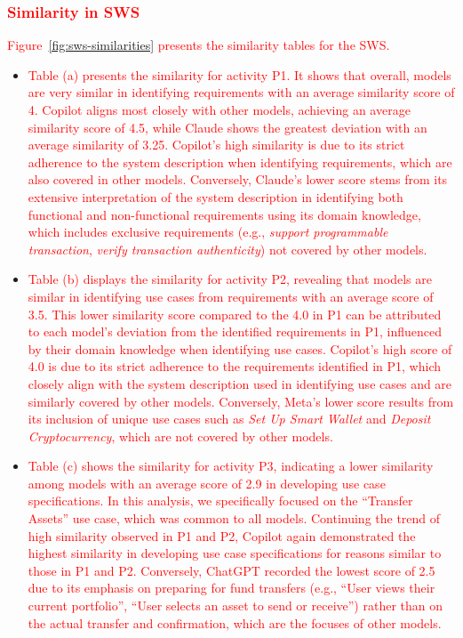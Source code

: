 \subsubsection{\textcolor{red}{Similarity in SWS}}
\label{sssec:sws-similarity}
\textcolor{red}{Figure~\ref{fig:sws-similarities} presents the similarity tables for the SWS.} 

\begin{itemize}
	\item \textcolor{red}{Table (a) presents the similarity for activity P1. It shows that overall, models are very similar in identifying requirements with an average similarity score of 4. Copilot aligns most closely with other models, achieving an average similarity score of 4.5, while Claude shows the greatest deviation with an average similarity of 3.25. Copilot's high similarity is due to its strict adherence to the system description when identifying requirements, which are also covered in other models. Conversely, Claude's lower score stems from its extensive interpretation of the system description in identifying both functional and non-functional requirements using its domain knowledge, which includes exclusive requirements (e.g., {\em support programmable transaction}, {\em verify transaction authenticity}) not covered by other models.}
	
	\item \textcolor{red}{Table (b) displays the similarity for activity P2, revealing that models are similar in identifying use cases from requirements with an average score of 3.5. This lower similarity score compared to the 4.0 in P1 can be attributed to each model's deviation from the identified requirements in P1, influenced by their domain knowledge when identifying use cases. Copilot's high score of 4.0 is due to its strict adherence to the requirements identified in P1, which closely align with the system description used in identifying use cases and are similarly covered by other models. Conversely, Meta's lower score results from its inclusion of unique use cases such as \emph{Set Up Smart Wallet} and \emph{Deposit Cryptocurrency}, which are not covered by other models.}
	
	\item \textcolor{red}{Table (c) shows the similarity for activity P3, indicating a lower similarity among models with an average score of 2.9 in developing use case specifications. In this analysis, we specifically focused on the ``Transfer Assets'' use case, which was common to all models. Continuing the trend of high similarity observed in P1 and P2, Copilot again demonstrated the highest similarity in developing use case specifications for reasons similar to those in P1 and P2. Conversely, ChatGPT recorded the lowest score of 2.5 due to its emphasis on preparing for fund transfers (e.g., ``User views their current portfolio'', ``User selects an asset to send or receive'') rather than on the actual transfer and confirmation, which are the focuses of other models.}
	

\end{itemize}
